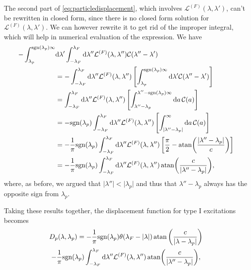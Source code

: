 \documentclass[11pt, a4paper,draft]{report} %
\newcommand{\inversetruncc}{\mathcal{L}}
\newcommand{\kernel}{\mathcal{C}}
\begin{document}
The second part of \cref{eq:particledisplacement}, which involves \(\inversetruncc^{(F)}(\lambda,\lambda')\), can't be rewritten in closed form, since there is no closed form solution for \(\inversetruncc^{(F)}(\lambda,\lambda')\).
We can however rewrite it to get rid of the improper integral, which will help in numerical evaluation of the expression.
We have
\begin{align}
	- \int_{\lambda_p}^{\textrm{sgn}(\lambda_p)\infty} &\dd \lambda' \int_{-\lambda_F}^{\lambda_F} \dd \lambda''  \inversetruncc^{(F)}(\lambda,\lambda'') \kernel(\lambda''-\lambda')\\
	&= -  \int_{-\lambda_F}^{\lambda_F} \dd \lambda''   \inversetruncc^{(F)}(\lambda,\lambda'') \left[\int_{\lambda_p}^{\textrm{sgn}(\lambda_p)\infty} \dd \lambda'\kernel(\lambda''-\lambda') \right]\\
	&=   \int_{-\lambda_F}^{\lambda_F} \dd \lambda''   \inversetruncc^{(F)}(\lambda,\lambda'') \left[\int_{\lambda''-\lambda_p}^{\lambda''-\textrm{sgn}(\lambda_p)\infty} \dd a\,\kernel(a) \right]\\
	&= -\textrm{sgn}(\lambda_p) \int_{-\lambda_F}^{\lambda_F} \dd \lambda''   \inversetruncc^{(F)}(\lambda,\lambda'') \left[\int_{\lvert\lambda''-\lambda_p\rvert}^{\infty} \dd a\,\kernel(a) \right]\\
	&= -\frac{1}{\pi}\textrm{sgn}(\lambda_p) \int_{-\lambda_F}^{\lambda_F} \dd \lambda''   \inversetruncc^{(F)}(\lambda,\lambda'') \left[\frac{\pi}{2} - \atan(\frac{\lvert\lambda''-\lambda_p\rvert}{c})\right]\\
	&= -\frac{1}{\pi}\textrm{sgn}(\lambda_p) \int_{-\lambda_F}^{\lambda_F} \dd \lambda''   \inversetruncc^{(F)}(\lambda,\lambda'') \atan(\frac{c}{\lvert\lambda''-\lambda_p\rvert}),
\end{align}
where, as before, we argued that \(\lvert\lambda''\rvert < \lvert\lambda_p\rvert\) and thus that \(\lambda'' - \lambda_p\) always has the opposite sign from \(\lambda_p\).

Taking these results together, the displacement function for type I excitations becomes 
\begin{multline}
	D_p(\lambda, \lambda_p) = - \frac{1}{\pi} \textrm{sgn}(\lambda_p) \theta(\lambda_F - \lvert \lambda \rvert)  \atan\left(\frac{c}{\lvert\lambda-\lambda_p\rvert}\right) \\-\frac{1}{\pi}\textrm{sgn}(\lambda_p) \int_{-\lambda_F}^{\lambda_F} \dd \lambda''   \inversetruncc^{(F)}(\lambda,\lambda'') \atan(\frac{c}{\lvert\lambda''-\lambda_p\rvert}),
\end{multline}
\end{document}
